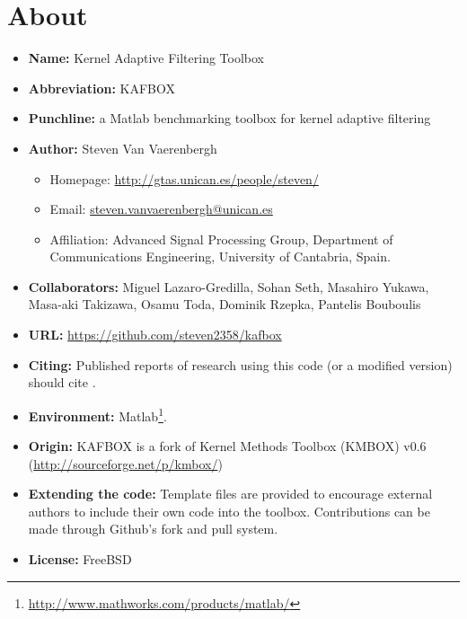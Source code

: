 \documentclass[]{report}
\begin{document}


\chapter{About}
\begin{itemize}
\item {\bf Name:} Kernel Adaptive Filtering Toolbox
\item {\bf Abbreviation:} KAFBOX
\item {\bf Punchline:} a Matlab benchmarking toolbox for kernel adaptive filtering
\item {\bf Author:} Steven Van Vaerenbergh
  \begin{itemize}
  \item Homepage: \url{http://gtas.unican.es/people/steven/}
  \item Email: \url{steven.vanvaerenbergh@unican.es}
  \item Affiliation: Advanced Signal Processing Group, Department of Communications Engineering, University of Cantabria, Spain.
  \end{itemize}
\item {\bf Collaborators:} Miguel Lazaro-Gredilla, Sohan Seth, Masahiro Yukawa, Masa-aki Takizawa, Osamu Toda, Dominik Rzepka, Pantelis Bouboulis
\item {\bf URL:} \url{https://github.com/steven2358/kafbox}
\item {\bf Citing:} Published reports of research using this code (or a modified version) should cite \cite{vanvaerenbergh2013comparative}.
\item {\bf Environment:} Matlab\footnote{\url{http://www.mathworks.com/products/matlab/}}.
\item {\bf Origin:} KAFBOX is a fork of Kernel Methods Toolbox (KMBOX) v0.6 (\url{http://sourceforge.net/p/kmbox/})
\item {\bf Extending the code:} Template files are provided to encourage external authors to include their own code into the toolbox. Contributions can be made through Github's fork and pull system.
\item {\bf License:} FreeBSD
\end{itemize}





\end{document}
